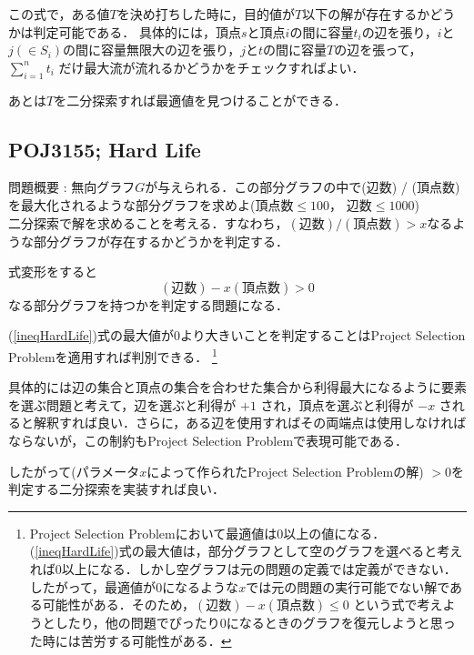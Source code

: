 \documentclass[13pt]{jarticle}
\theoremstyle{nonitalic} %
\begin{document}
この式で，ある値$T$を決め打ちした時に，目的値が$T$以下の解が存在するかどうかは判定可能である． 具体的には，頂点$s$と頂点$i$の間に容量$t_i$の辺を張り，$i$と$j (\in S_i)$の間に容量無限大の辺を張り，$j$と$t$の間に容量$T$の辺を張って，$\sum_{i=1}^n t_i $ だけ最大流が流れるかどうかをチェックすればよい．

あとは$T$を二分探索すれば最適値を見つけることができる．


\subsection{POJ3155; Hard Life}
\label{hardlife}
問題概要 : 無向グラフ$G$が与えられる．この部分グラフの中で(辺数) / (頂点数)を最大化されるような部分グラフを求めよ(頂点数$\leq 100$， 辺数$\leq 1000$)\\

二分探索で解を求めることを考える．すなわち，$ (\textrm{辺数}) / (\textrm{頂点数})  > x$なるような部分グラフが存在するかどうかを判定する．

式変形をすると
\begin{equation}
  (\textrm{辺数}) - x (\textrm{頂点数}) > 0 \label{ineqHardLife}
\end{equation}
なる部分グラフを持つかを判定する問題になる．

(\ref{ineqHardLife})式の最大値が$0$より大きいことを判定することはProject Selection Problemを適用すれば判別できる． \footnote{ Project Selection Problemにおいて最適値は$0$以上の値になる．(\ref{ineqHardLife})式の最大値は，部分グラフとして空のグラフを選べると考えれば$0$以上になる．しかし空グラフは元の問題の定義では定義ができない．したがって，最適値が$0$になるような$x$では元の問題の実行可能でない解である可能性がある．そのため，$ (\textrm{辺数}) - x (\textrm{頂点数}) \leq 0 $  という式で考えようとしたり，他の問題でぴったり$0$になるときのグラフを復元しようと思った時には苦労する可能性がある．}

具体的には辺の集合と頂点の集合を合わせた集合から利得最大になるように要素を選ぶ問題と考えて，辺を選ぶと利得が $+1$ され，頂点を選ぶと利得が $-x$ されると解釈すれば良い．さらに，ある辺を使用すればその両端点は使用しなければならないが，この制約もProject Selection Problemで表現可能である． 

したがって(パラメータ$x$によって作られたProject Selection Problemの解) $>0$を判定する二分探索を実装すれば良い． 


\end{document}
